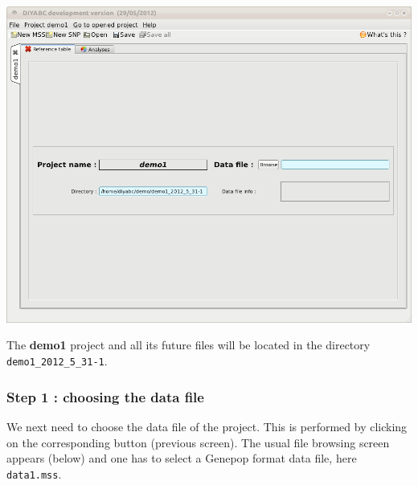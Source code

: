 \includegraphics[scale=0.35]{gui_pictures/Capture-DIYABC-8}

The \textbf{demo1} project and all its future files will be located
in the directory \texttt{demo1\_2012\_5\_31-1}.


\subsubsection{Step 1 : choosing the data file}

We next need to choose the data file of the project. This is performed
by clicking on the corresponding  button (previous
screen). The usual file browsing screen appears (below) and one has
to select a Genepop format data file, here \texttt{data1.mss}. \\


